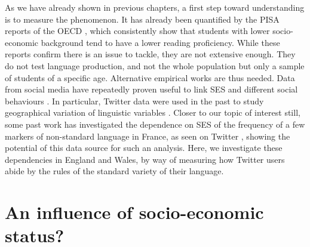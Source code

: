 \documentclass[../thesis.tex]{subfiles}
\begin{document}
As we have already shown in previous chapters, a first step toward understanding
is to measure the phenomenon. It has already been quantified by the PISA reports of the
OECD \cite{OECDWhereAll2019}, which consistently show that students with lower
socio-economic background tend to have a lower reading proficiency. While these reports confirm
there is an issue to tackle, they are not extensive enough. They do not test language
production, and not the whole population but only a sample of students of a specific
age. Alternative empirical works are thus needed. Data from social media have repeatedly
proven useful to link \ac{SES} and different social behaviours
\cite{GaoComputationalSocioeconomics2019}. In particular, Twitter data were used in the
past to study geographical variation of linguistic variables
\cite{EisensteinDiffusionLexical2014}. Closer to our topic of interest still, some past
work has investigated the dependence on \ac{SES} of the frequency of a few markers of
non-standard language in France, as seen on Twitter
\cite{AbitbolSocioeconomicDependencies2018}, showing the potential of this data source
for such an analysis. Here, we
investigate these dependencies in England and Wales, by way of measuring how Twitter
users abide by the rules of the standard variety of their language.



\section{An influence of socio-economic status?}
\end{document}
